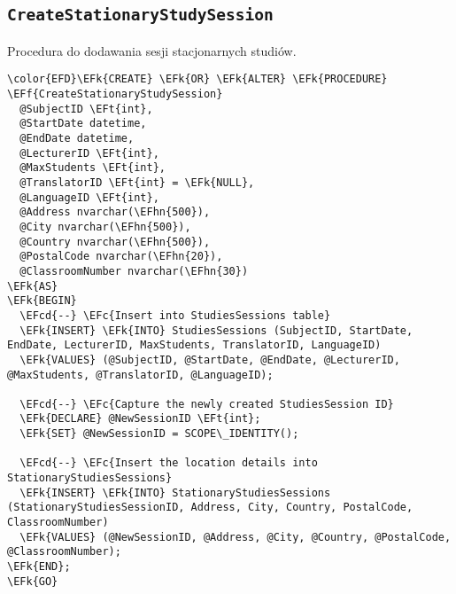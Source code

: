 \documentclass[11pt]{article}
\newcommand{\EFc}[1]{\textcolor{EFc}{\textit{#1}}} %
\newcommand{\EFcd}[1]{\textcolor{EFcd}{\textit{#1}}} %
\newcommand{\EFk}[1]{\textcolor{EFk}{\textbf{#1}}} %
\newcommand{\EFf}[1]{\textcolor{EFf}{#1}} %
\newcommand{\EFt}[1]{\textcolor{EFt}{\textbf{#1}}} %
\newcommand{\EFhn}[1]{\textcolor{EFhn}{#1}} %
\begin{document}
\subsection{\texttt{CreateStationaryStudySession}}
\label{sec:orge072a81}
Procedura do dodawania sesji stacjonarnych studiów.
\begin{Code}
\begin{Verbatim}
\color{EFD}\EFk{CREATE} \EFk{OR} \EFk{ALTER} \EFk{PROCEDURE} \EFf{CreateStationaryStudySession}
  @SubjectID \EFt{int},
  @StartDate datetime,
  @EndDate datetime,
  @LecturerID \EFt{int},
  @MaxStudents \EFt{int},
  @TranslatorID \EFt{int} = \EFk{NULL},
  @LanguageID \EFt{int},
  @Address nvarchar(\EFhn{500}),
  @City nvarchar(\EFhn{500}),
  @Country nvarchar(\EFhn{500}),
  @PostalCode nvarchar(\EFhn{20}),
  @ClassroomNumber nvarchar(\EFhn{30})
\EFk{AS}
\EFk{BEGIN}
  \EFcd{--} \EFc{Insert into StudiesSessions table}
  \EFk{INSERT} \EFk{INTO} StudiesSessions (SubjectID, StartDate, EndDate, LecturerID, MaxStudents, TranslatorID, LanguageID)
  \EFk{VALUES} (@SubjectID, @StartDate, @EndDate, @LecturerID, @MaxStudents, @TranslatorID, @LanguageID);

  \EFcd{--} \EFc{Capture the newly created StudiesSession ID}
  \EFk{DECLARE} @NewSessionID \EFt{int};
  \EFk{SET} @NewSessionID = SCOPE\_IDENTITY();

  \EFcd{--} \EFc{Insert the location details into StationaryStudiesSessions}
  \EFk{INSERT} \EFk{INTO} StationaryStudiesSessions (StationaryStudiesSessionID, Address, City, Country, PostalCode, ClassroomNumber)
  \EFk{VALUES} (@NewSessionID, @Address, @City, @Country, @PostalCode, @ClassroomNumber);
\EFk{END};
\EFk{GO}
\end{Verbatim}
\end{Code}
\end{document}
